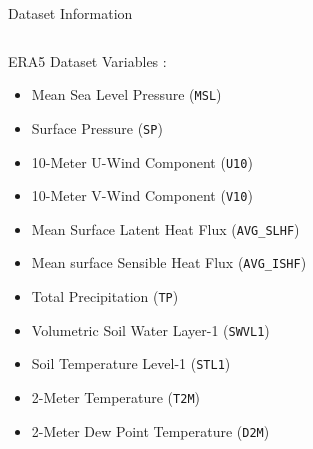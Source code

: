 \documentclass[10pt, aspectratio=169,t,xcolor=table]{beamer}
\begin{document}
\begin{frame}{Dataset Information}
	\vspace{-0.1cm}
	\begin{columns}[t]
		\begin{block}{\small ERA5 Dataset Variables :}
			\begin{itemize}\footnotesize
				\item Mean Sea Level Pressure (\texttt{MSL})
				\item Surface Pressure (\texttt{SP})
				\item 10-Meter U-Wind Component (\texttt{U10})
				\item 10-Meter V-Wind Component (\texttt{V10})
				\item Mean Surface Latent Heat Flux (\texttt{AVG\_SLHF})
				\item Mean surface Sensible Heat Flux (\texttt{AVG\_ISHF})
				\item Total Precipitation (\texttt{TP})
				\item Volumetric Soil Water Layer-1 (\texttt{SWVL1})
				\item Soil Temperature Level-1 (\texttt{STL1})
				\item 2-Meter Temperature (\texttt{T2M})
				\item 2-Meter Dew Point Temperature (\texttt{D2M})
			\end{itemize}
		\end{block}


\end{columns}
\end{frame}
\end{document}
